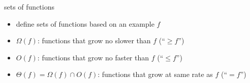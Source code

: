 \begin{frame}{sets of functions}
\begin{itemize}
\item define sets of functions based on an example $f$
\vspace{.5cm}
\item $\Omega(f)$: functions that grow no slower than $f$ (``$\ge f$'')
\item $O(f)$: functions that grow no faster than $f$ (``$\le f$'')
\item $\Theta(f) = \Omega(f) \cap O(f)$: functions that grow at same rate as $f$ (``$= f$'')
\end{itemize}
\end{frame}
